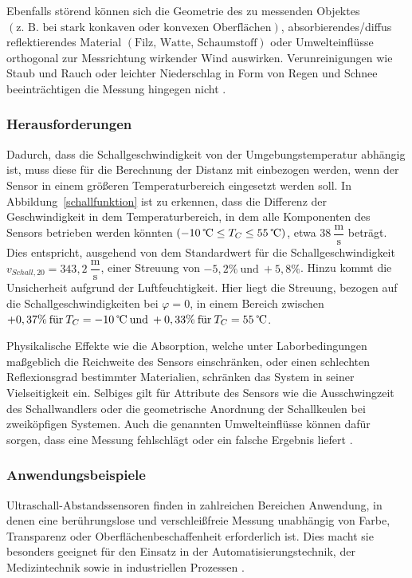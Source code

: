 Ebenfalls störend können sich die Geometrie des zu messenden Objektes $\left(\text{z. B. bei stark konkaven oder konvexen Oberflächen}\right)$, absorbierendes/diffus reflektierendes Material $\left(\text{Filz, Watte, Schaumstoff}\right)$ oder Umwelteinflüsse orthogonal zur Messrichtung wirkender Wind auswirken. Verunreinigungen wie Staub und Rauch oder leichter Niederschlag in Form von Regen und Schnee beeinträchtigen die Messung hingegen nicht \cite{Hering:2023}.


\subsubsection{Herausforderungen}

Dadurch, dass die Schallgeschwindigkeit von der Umgebungstemperatur abhängig ist, muss diese für die Berechnung der Distanz mit einbezogen werden, wenn der Sensor in einem größeren Temperaturbereich eingesetzt werden soll. In Abbildung~\ref{schallfunktion} ist zu erkennen, dass die Differenz der Geschwindigkeit in dem Temperaturbereich, in dem alle Komponenten des Sensors betrieben werden könnten $\left(-10 \:\text{\textcelsius}\leq T_{C}\leq55 \:\text{\textcelsius}\right)$, etwa $38 \:\dfrac{\text{m}}{\text{s}}$ beträgt. Dies entspricht, ausgehend von dem Standardwert für die Schallgeschwindigkeit $v_{Schall,20}=343,2\:\dfrac{\text{m}}{\text{s}}$, einer Streuung von $-5,2\% \:\text{und} \:+5,8\%$. Hinzu kommt die Unsicherheit aufgrund der Luftfeuchtigkeit. Hier liegt die Streuung, bezogen auf die Schallgeschwindigkeiten bei $\varphi=0$, in einem Bereich zwischen $+0,37\% \:\text{für} \:T_{C}=-10\:\text{\textcelsius} \:\text{und} \:+0,33\% \:\text{für} \:T_{C}=55 \:\text{\textcelsius}$.

Physikalische Effekte wie die Absorption, welche unter Laborbedingungen maßgeblich die Reichweite des Sensors einschränken, oder einen schlechten Reflexionsgrad bestimmter Materialien, schränken das System in seiner Vielseitigkeit ein. Selbiges gilt für Attribute des Sensors wie die Ausschwingzeit des Schallwandlers oder die geometrische Anordnung der Schallkeulen bei zweiköpfigen Systemen.
Auch die genannten Umwelteinflüsse können dafür sorgen, dass eine Messung fehlschlägt oder ein falsche Ergebnis liefert \cite{ifm:2025}.

\subsubsection{Anwendungsbeispiele}
Ultraschall-Abstandssensoren finden in zahlreichen Bereichen Anwendung, in denen eine berührungslose und verschleißfreie Messung unabhängig von Farbe, Transparenz oder Oberflächenbeschaffenheit erforderlich ist. Dies macht sie besonders geeignet für den Einsatz in der Automatisierungstechnik, der Medizintechnik sowie in industriellen Prozessen \cite{Conrad:2024,Smoot:2021}.

